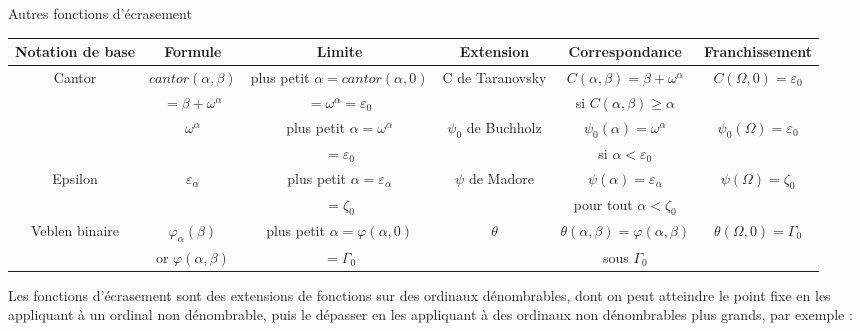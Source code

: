 \documentclass[12pt]{beamer}
\begin{document}
\begin{frame}

Autres fonctions d'écrasement

\bigskip
\begin{changemargin}{-1cm}{0cm}
\tiny

\begin{tabular}{|c|c|c|c|c|c|} \hline
Notation de base	& Formule			& Limite					& Extension		& Correspondance					& Franchissement 				\\ \hline
Cantor		& \( cantor(\alpha,\beta) \)	& plus petit \( \alpha = cantor(\alpha,0) \)	& C de Taranovsky	& \( C(\alpha,\beta) = \beta+\omega^\alpha \)		& \( C(\Omega,0) = \varepsilon_0 \)	\\
		& \( = \beta + \omega^\alpha \)	& \( = \omega^\alpha = \varepsilon_0 \)	&			& si \( C(\alpha,\beta) \geq \alpha \)			&					\\ \hline
		& \( \omega^\alpha \)		& plus petit \( \alpha = \omega^\alpha \)	& \( \psi_0 \) de Buchholz & \( \psi_0(\alpha) = \omega^\alpha \)			& \( \psi_0(\Omega) = \varepsilon_0 \)	\\
		&				& \( = \varepsilon_0 \)			&			& si \( \alpha < \varepsilon_0 \)			&					\\ \hline
Epsilon		& \( \varepsilon_\alpha	\)	& plus petit \( \alpha = \varepsilon_\alpha\)& \( \psi \) de Madore	& \( \psi(\alpha) = \varepsilon_\alpha \)		& \( \psi(\Omega) = \zeta_0 \)		\\
		&				& \( = \zeta_0 \)			&			& pour tout \( \alpha < \zeta_0 \)			& 					\\ \hline
Veblen binaire	& \( \varphi_\alpha(\beta) \)	& plus petit \( \alpha = \varphi(\alpha,0) \)& \( \theta \)		& \( \theta(\alpha,\beta) = \varphi(\alpha,\beta) \)	& \( \theta(\Omega,0) = \Gamma_0 \)	\\
		& or \( \varphi(\alpha,\beta) \)& \( = \Gamma_0 \)			&			& sous \( \Gamma_0 \)					&					\\ \hline
													
\end{tabular}
\end{changemargin}

\footnotesize

Les fonctions d'écrasement sont des extensions de fonctions sur des ordinaux dénombrables, dont on peut atteindre le point fixe en les appliquant à un ordinal non dénombrable, puis le dépasser en les appliquant à des ordinaux non dénombrables plus grands, par exemple : 

\vspace{-0.4cm}
\smallskip
\begin{itemize}
     \setlength{\itemsep}{1pt}
     \setlength{\parskip}{0pt}
     \setlength{\parsep}{0pt}


\end{itemize}
\end{frame}
\end{document}
